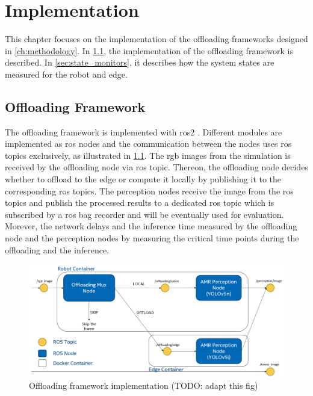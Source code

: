 \chapter{Implementation}\label{ch:implementation}

This chapter focuses on the implementation of the offloading frameworks designed in \cref{ch:methodology}. In \cref{sec:offloading_framework}, the implementation of the offloading framework is described. In \cref{sec:state_monitors}, it describes how the system states are measured for the robot and edge. 

\section{Offloading Framework}\label{sec:offloading_framework}

The offloading framework is implemented with \gls{ros}2 \cite{Macenski2022}. Different modules are implemented as \gls{ros} nodes and the communication between the nodes uses \gls{ros} topics exclusively, as illustrated in \cref{fig:offloading_frame_work_implementation}. The \gls{rgb} images from the simulation is received by the offloading node via \gls{ros} topic. Thereon, the offloading node decides whether to offload to the edge or compute it locally by publishing it to the corresponding \gls{ros} topics. The perception nodes receive the image from the \gls{ros} topics and publish the processed results to a dedicated \gls{ros} topic which is subscribed by a \gls{ros} bag recorder and will be eventually used for evaluation. Morever, the network delays and the inference time measured by the offloading node and the perception nodes by measuring the critical time points during the offloading and the inference. 



\begin{figure}
    \centering
    \includegraphics[width=\linewidth]{source/general_setup.png}
    \caption{Offloading framework implementation (TODO: adapt this fig)}
    \label{fig:offloading_frame_work_implementation}
\end{figure}

